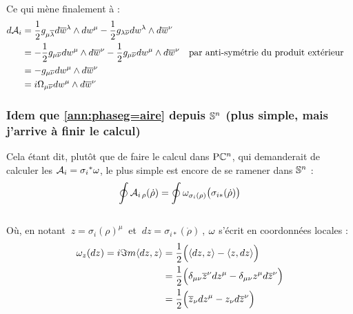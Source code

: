 \\
Ce qui mène finalement à :
\begin{align*}
	d\locconn_i &= \frac{1}{2} g_{\mu \congu{\lambda}} d\congu{w}^\lambda \wedge dw^\mu  - \frac{1}{2} g_{\lambda \congu{\nu}} dw^\lambda \wedge d\congu{w}^\nu \\
	&= -\frac{1}{2} g_{\mu \congu{\nu}} dw^\mu \wedge d\congu{w}^\nu  - \frac{1}{2} g_{\mu \congu{\nu}} dw^\mu \wedge d\congu{w}^\nu  &  &\text{par anti-symétrie du produit extérieur}\\
	&= - g_{\mu \congu{\nu}} dw^\mu \wedge d\congu{w}^\nu \\
	&= i\Omega_{\mu \congu{\nu}} dw^\mu \wedge d\congu{w}^\nu
\end{align*}
\skipl




\subsubsection{\wip Idem que \ref{ann:phaseg=aire} depuis $\S{n}$ (plus simple, mais j'arrive à finir le calcul)} \label{ann:wedge2conn}

Cela étant dit, plutôt que de faire le calcul dans $\PC{n}$, qui demanderait de calculer les $\locconn_i = {\sigma_i}^*\conn$, le plus simple est encore de se ramener dans $\S{n}$ :
\[\oint \locconn_{i\, \rho}(\dot{\rho}) = \oint \omega_{\sigma_i(\rho)}\big(\sigma_{i*}(\dot{\rho})\big)\]
\\
Où, en notant $\ z = \sigma_i(\rho)^\mu\ $ et $\ dz = \sigma_{i*}(\dot{\rho})\ $,  $\conn$ s'écrit en coordonnées locales :
\begin{align*}
	\conn_z(dz) = i\Im m \langle dz , z\rangle &= \frac{1}{2}\Big( \langle dz , z \rangle - \langle z, dz \rangle \Big) \\
	&= \frac{1}{2}\Big( \delta_{\mu\nu} \congu{z}^\nu dz^\mu -  \delta_{\mu\nu} z^\mu d\congu{z}^\nu \Big) \\
	&= \frac{1}{2}\Big( \congu{z}_\nu dz^\mu -  z_\nu d\congu{z}^\nu \Big)
\end{align*}
\\

